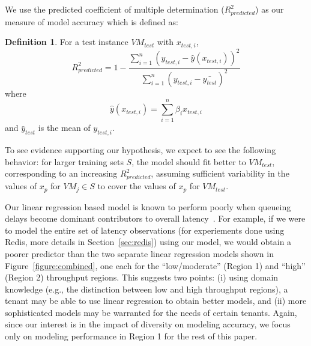  We use the predicted coefficient of multiple determination ($R^2_{predicted}$) as our measure of model accuracy which is defined as: 
\theoremstyle{definition}
\newtheorem{mydef}{Definition}
\begin{mydef}
For a test instance $VM_{test}$ with $x_{test,i}$,
\begin{displaymath}
R_{predicted}^2=1-\frac{\sum_{i=1}^{n} (y_{test,i} - \hat{y}(x_{test,i}))^{2}}{\sum_{i=1}^{n} (y_{test,i} - \bar{y_{test}})^{2}}
\end{displaymath}
where
\begin{displaymath}
\hat{y}(x_{test,i})=\sum_{i=1}^{n} \beta_i x_{test,i}
\end{displaymath}
and $\bar{y}_{test}$ is the mean of $y_{test,i}$.
\end{mydef}


To see evidence supporting our hypothesis, we expect to see the following behavior: for larger training sets $S$, the model should fit better to $VM_{test}$, corresponding to an increasing $R^2_{predicted}$, assuming sufficient variability in the values of $x_p$ for $VM_j\in S$ to cover the values of $x_p$ for $VM_{test}$.  

 Our linear regression based model is known to perform poorly when queueing delays become dominant contributors to overall latency~\cite{Stewart07}. 
For example, if we were to model the entire set of latency observations (for experiements done using Redis, more details
in Section~\ref{sec:redis}) using our model, we would obtain a poorer predictor than the two separate linear regression
models shown in Figure~\ref{figure:combined}, one each for the ``low/moderate'' (Region 1) and ``high'' (Region 2) throughput regions. This suggests two points: (i) using domain knowledge (e.g., the distinction between low and high throughput regions), a 
tenant may be able to use linear regression to obtain better models, and (ii) more sophisticated models may be 
warranted for the needs of certain tenants. Again, since our interest is in the impact of diversity on modeling accuracy,
we focus only on modeling performance in Region 1 for the rest of this paper. 

